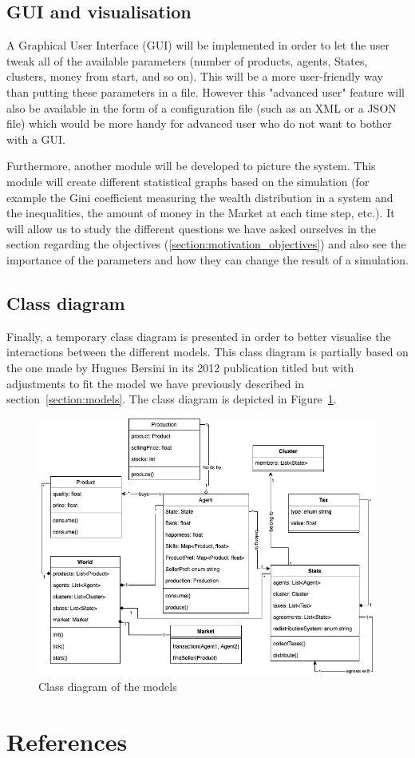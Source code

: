 \documentclass[12pt]{article}
\begin{document}
\subsection{GUI and visualisation}
A Graphical User Interface (GUI) will be implemented in order to let the user tweak all of the available parameters (number of products, agents, States, clusters, money from start, and so on). This will be a more user-friendly way than putting these parameters in a file. However this "advanced user" feature will also be available in the form of a configuration file (such as an XML or a JSON file) which would be more handy for advanced user who do not want to bother with a GUI.

Furthermore, another module will be developed to picture the system. This module will create different statistical graphs based on the simulation (for example the Gini coefficient measuring the wealth distribution in a system and the inequalities, the amount of money in the Market at each time step, etc.). It will allow us to study the different questions we have asked ourselves in the section regarding the objectives (\ref{section:motivation_objectives}) and also see the importance of the parameters and how they can change the result of a simulation.

\subsection{Class diagram}

Finally, a temporary class diagram is presented in order to better visualise the interactions between the different models. This class diagram is partially based on the one made by Hugues Bersini in its 2012 publication titled  \cite{umbforabm} but with adjustments to fit the model we have previously described in section~\ref{section:models}. The class diagram is depicted in Figure~\ref{fig:class_diagram}.


    \begin{figure}[H]
        \centering
        \includegraphics[width=1\textwidth]{img/class_diagram.png}
        \caption{Class diagram of the models}
        \label{fig:class_diagram}
    \end{figure}


\newpage

\section{References}
\printbibliography[heading=none]
\end{document}

